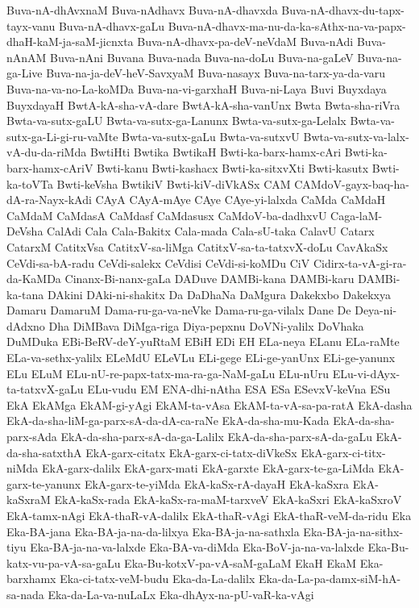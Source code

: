 {Buva-nA-dhAvxnaM
Buva-nAdhavx
Buva-nA-dhavxda
Buva-nA-dhavx-du-tapx-tayx-vanu
Buva-nA-dhavx-gaLu
Buva-nA-dhavx-ma-nu-da-ka-sAthx-na-va-papx-dhaH-kaM-ja-saM-jicnxta
Buva-nA-dhavx-pa-deV-neVdaM
Buva-nAdi
Buva-nAnAM
Buva-nAni
Buvana
Buva-nada
Buva-na-doLu
Buva-na-gaLeV
Buva-na-ga-Live
Buva-na-ja-deV-heV-SavxyaM
Buva-nasayx
Buva-na-tarx-ya-da-varu
Buva-na-va-no-La-koMDa
Buva-na-vi-garxhaH
Buva-ni-Laya
Buvi
Buyxdaya
BuyxdayaH
BwtA-kA-sha-vA-dare
BwtA-kA-sha-vanUnx
Bwta
Bwta-sha-riVra
Bwta-va-sutx-gaLU
Bwta-va-sutx-ga-Lanunx
Bwta-va-sutx-ga-Lelalx
Bwta-va-sutx-ga-Li-gi-ru-vaMte
Bwta-va-sutx-gaLu
Bwta-va-sutxvU
Bwta-va-sutx-va-lalx-vA-du-da-riMda
BwtiHti
Bwtika
BwtikaH
Bwti-ka-barx-hamx-cAri
Bwti-ka-barx-hamx-cAriV
Bwti-kanu
Bwti-kashacx
Bwti-ka-sitxvXti
Bwti-kasutx
Bwti-ka-toVTa
Bwti-keVsha
BwtikiV
Bwti-kiV-diVkASx
CAM
CAMdoV-gayx-baq-ha-dA-ra-Nayx-kAdi
CAyA
CAyA-mAye
CAye
CAye-yi-lalxda
CaMda
CaMdaH
CaMdaM
CaMdasA
CaMdasf
CaMdasusx
CaMdoV-ba-dadhxvU
Caga-laM-DeVsha
CalAdi
Cala
Cala-Bakitx
Cala-mada
Cala-sU-taka
CalavU
Catarx
CatarxM
CatitxVsa
CatitxV-sa-liMga
CatitxV-sa-ta-tatxvX-doLu
CavAkaSx
CeVdi-sa-bA-radu
CeVdi-salekx
CeVdisi
CeVdi-si-koMDu
CiV
Cidirx-ta-vA-gi-ra-da-KaMDa
Cinanx-Bi-nanx-gaLa
DADuve
DAMBi-kana
DAMBi-karu
DAMBi-ka-tana
DAkini
DAki-ni-shakitx
Da
DaDhaNa
DaMgura
Dakekxbo
Dakekxya
Damaru
DamaruM
Dama-ru-ga-va-neVke
Dama-ru-ga-vilalx
Dane
De
Deya-ni-dAdxno
Dha
DiMBava
DiMga-riga
Diya-pepxnu
DoVNi-yalilx
DoVhaka
DuMDuka
EBi-BeRV-deY-yuRtaM
EBiH
EDi
EH
ELa-neya
ELanu
ELa-raMte
ELa-va-sethx-yalilx
ELeMdU
ELeVLu
ELi-gege
ELi-ge-yanUnx
ELi-ge-yanunx
ELu
ELuM
ELu-nU-re-papx-tatx-ma-ra-ga-NaM-gaLu
ELu-nUru
ELu-vi-dAyx-ta-tatxvX-gaLu
ELu-vudu
EM
ENA-dhi-nAtha
ESA
ESa
ESevxV-keVna
ESu
EkA
EkAMga
EkAM-gi-yAgi
EkAM-ta-vAsa
EkAM-ta-vA-sa-pa-ratA
EkA-dasha
EkA-da-sha-liM-ga-parx-sA-da-dA-ca-raNe
EkA-da-sha-mu-Kada
EkA-da-sha-parx-sAda
EkA-da-sha-parx-sA-da-ga-Lalilx
EkA-da-sha-parx-sA-da-gaLu
EkA-da-sha-satxthA
EkA-garx-citatx
EkA-garx-ci-tatx-diVkeSx
EkA-garx-ci-titx-niMda
EkA-garx-dalilx
EkA-garx-mati
EkA-garxte
EkA-garx-te-ga-LiMda
EkA-garx-te-yanunx
EkA-garx-te-yiMda
EkA-kaSx-rA-dayaH
EkA-kaSxra
EkA-kaSxraM
EkA-kaSx-rada
EkA-kaSx-ra-maM-tarxveV
EkA-kaSxri
EkA-kaSxroV
EkA-tamx-nAgi
EkA-thaR-vA-dalilx
EkA-thaR-vAgi
EkA-thaR-veM-da-ridu
Eka
Eka-BA-jana
Eka-BA-ja-na-da-lilxya
Eka-BA-ja-na-sathxla
Eka-BA-ja-na-sithx-tiyu
Eka-BA-ja-na-va-lalxde
Eka-BA-va-diMda
Eka-BoV-ja-na-va-lalxde
Eka-Bu-katx-vu-pa-vA-sa-gaLu
Eka-Bu-kotxV-pa-vA-saM-gaLaM
EkaH
EkaM
Eka-barxhamx
Eka-ci-tatx-veM-budu
Eka-da-La-dalilx
Eka-da-La-pa-damx-siM-hA-sa-nada
Eka-da-La-va-nuLaLx
Eka-dhAyx-na-pU-vaR-ka-vAgi
}

